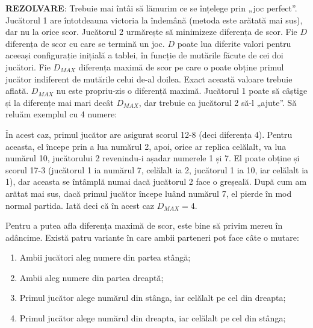 {\bf REZOLVARE}: Trebuie mai întâi să lămurim ce se înțelege prin „joc
perfect”. Jucătorul 1 are întotdeauna victoria la îndemână (metoda este
arătată mai sus), dar nu la orice scor. Jucătorul 2 urmărește să minimizeze
diferența de scor. Fie $D$ diferența de scor cu care se termină un joc. $D$
poate lua diferite valori pentru aceeași configurație inițială a tablei, în
funcție de mutările făcute de cei doi jucători. Fie $D_{MAX}$ diferența maximă
de scor pe care o poate obține primul jucător indiferent de mutările celui
de-al doilea. Exact această valoare trebuie aflată. $D_{MAX}$ nu este
propriu-zis o diferență maximă. Jucătorul 1 poate să câștige și la diferențe
mai mari decât $D_{MAX}$, dar trebuie ca jucătorul 2 să-l „ajute”. Să reluăm
exemplul cu 4 numere:


În acest caz, primul jucător are asigurat scorul 12-8 (deci diferența
4). Pentru aceasta, el începe prin a lua numărul 2, apoi, orice ar replica
celălalt, va lua numărul 10, jucătorului 2 revenindu-i așadar numerele 1 și
7. El poate obține și scorul 17-3 (jucătorul 1 ia numărul 7, celălalt ia 2,
jucătorul 1 ia 10, iar celălalt ia 1), dar aceasta se întâmplă numai dacă
jucătorul 2 face o greșeală. După cum am arătat mai sus, dacă primul jucător
începe luând numărul 7, el pierde în mod normal partida. Iată deci că în acest
caz $D_{MAX}=4$.

Pentru a putea afla diferența maximă de scor, este bine să privim mereu în
adâncime. Există patru variante în care ambii parteneri pot face câte o
mutare:

\begin{enumerate}

\item Ambii jucători aleg numere din partea stângă;

\item Ambii aleg numere din partea dreaptă;

\item Primul jucător alege numărul din stânga, iar celălalt pe cel din
  dreapta;

\item Primul jucător alege numărul din dreapta, iar celălalt pe cel din
  stânga;

\end{enumerate}

